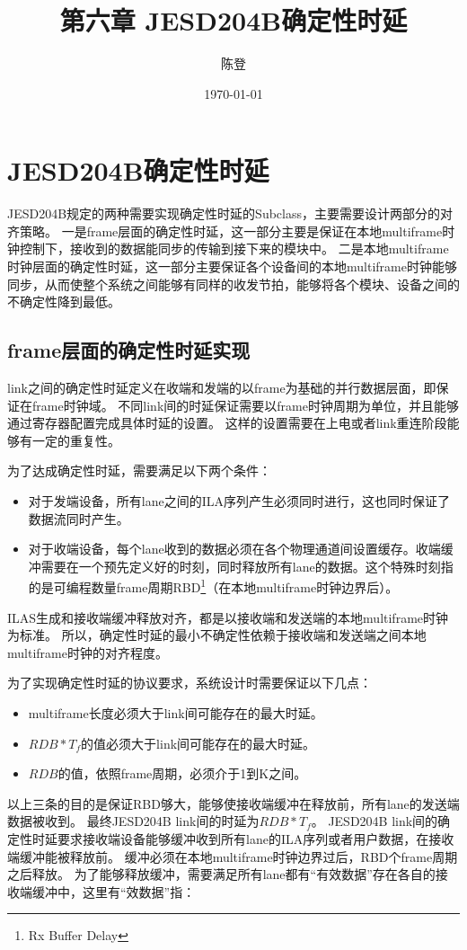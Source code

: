 \documentclass[UTF8]{ctexart}
\title{第六章 JESD204B确定性时延}
\author{陈登}
\date{\today}
\begin{document}
\section{JESD204B确定性时延}

JESD204B规定的两种需要实现确定性时延的Subclass，主要需要设计两部分的对齐策略。
一是frame层面的确定性时延，这一部分主要是保证在本地multiframe时钟控制下，接收到的数据能同步的传输到接下来的模块中。
二是本地multiframe时钟层面的确定性时延，这一部分主要保证各个设备间的本地multiframe时钟能够同步，从而使整个系统之间能够有同样的收发节拍，能够将各个模块、设备之间的不确定性降到最低。

\subsection{frame层面的确定性时延实现}

link之间的确定性时延定义在收端和发端的以frame为基础的并行数据层面，即保证在frame时钟域。
不同link间的时延保证需要以frame时钟周期为单位，并且能够通过寄存器配置完成具体时延的设置。
这样的设置需要在上电或者link重连阶段能够有一定的重复性。

为了达成确定性时延，需要满足以下两个条件：

\begin{itemize}
\item 对于发端设备，所有lane之间的ILA序列产生必须同时进行，这也同时保证了数据流同时产生。
\item 对于收端设备，每个lane收到的数据必须在各个物理通道间设置缓存。收端缓冲需要在一个预先定义好的时刻，同时释放所有lane的数据。这个特殊时刻指的是可编程数量frame周期RBD\footnote{Rx Buffer Delay}（在本地multiframe时钟边界后）。
\end{itemize}

ILAS生成和接收端缓冲释放对齐，都是以接收端和发送端的本地multiframe时钟为标准。
所以，确定性时延的最小不确定性依赖于接收端和发送端之间本地multiframe时钟的对齐程度。

为了实现确定性时延的协议要求，系统设计时需要保证以下几点：

\begin{itemize}
\item multiframe长度必须大于link间可能存在的最大时延。
\item $RDB * T_f$的值必须大于link间可能存在的最大时延。
\item $RDB$的值，依照frame周期，必须介于1到K之间。
\end{itemize}

以上三条的目的是保证RBD够大，能够使接收端缓冲在释放前，所有lane的发送端数据被收到。
最终JESD204B link间的时延为$RDB * T_f$。
JESD204B link间的确定性时延要求接收端设备能够缓冲收到所有lane的ILA序列或者用户数据，在接收端缓冲能被释放前。
缓冲必须在本地multiframe时钟边界过后，RBD个frame周期之后释放。
为了能够释放缓冲，需要满足所有lane都有“有效数据”存在各自的接收端缓冲中，这里有“效数据”指：
\end{document}
